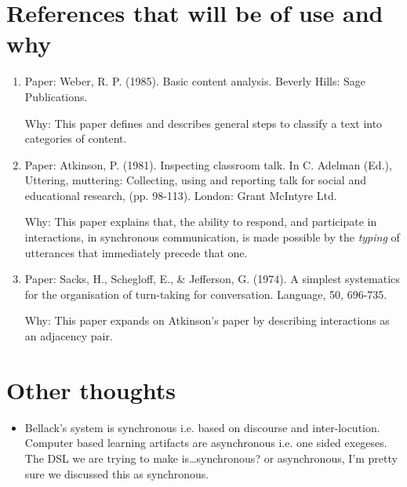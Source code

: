\documentclass[10pt, letterpaper]{article}
\begin{document}
\section*{References that will be of use and why}
\label{sec:orgb3f7f70}
\begin{enumerate}
\item Paper: Weber, R. P. (1985). Basic content analysis. Beverly Hills: Sage
Publications.

Why: This paper defines and describes general steps to classify a text into
categories of content.

\item Paper: Atkinson, P. (1981). Inspecting classroom talk. In C. Adelman (Ed.),
Uttering, muttering: Collecting, using and reporting talk for social and
educational research, (pp. 98-113). London: Grant McIntyre Ltd. 

Why: This paper explains that, the ability to respond, and participate in
interactions, in synchronous communication, is made possible by the \emph{typing}
of utterances that immediately precede that one.

\item Paper: Sacks, H., Schegloff, E., \& Jefferson, G. (1974). A simplest
systematics for the organisation of turn-taking for conversation. Language,
50, 696-735.

Why: This paper expands on Atkinson's paper by describing interactions as
an adjacency pair.
\end{enumerate}


\section*{Other thoughts}
\label{sec:orgcd6c308}
\begin{itemize}
\item Bellack's system is synchronous i.e. based on discourse and inter-locution.
Computer based learning artifacts are asynchronous i.e. one sided exegeses.
The DSL we are trying to make is\ldots{}synchronous? or asynchronous, I'm
pretty sure we discussed this as synchronous.
\end{itemize}
\end{document}
